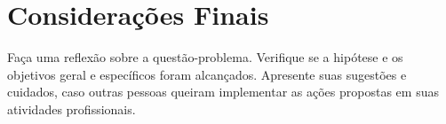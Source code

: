 \chapter{Considera\c{c}\~oes Finais}
\label{cap:conclusao}

Fa\c{c}a uma reflex\~ao sobre a quest\~ao-problema. Verifique se a
hip\'otese e os objetivos geral e espec\'ificos foram alcan\c{c}ados.
Apresente suas sugest\~oes e cuidados, caso outras pessoas queiram
implementar as a\c{c}\~oes propostas em suas atividades profissionais.
